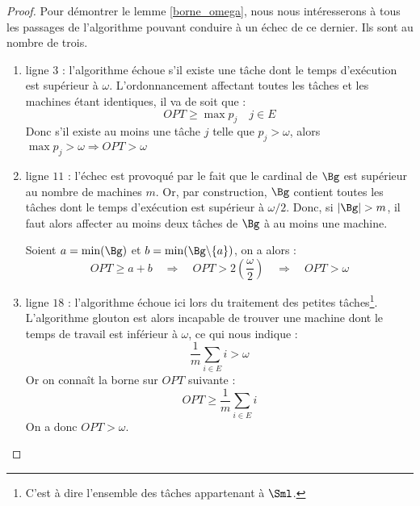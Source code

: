 \documentclass[a4paper,12pt]{thesis}
\begin{document}
\begin{proof}
    Pour démontrer le lemme \ref{borne_omega}, nous nous intéresserons à tous les passages de
    l'algorithme pouvant conduire à un échec de ce dernier. Ils sont au nombre de trois.
    \begin{enumerate}
        \item ligne $3$ : l'algorithme échoue s'il existe une tâche dont le temps d'exécution est
            supérieur à $\omega$. L'ordonnancement affectant toutes les tâches et les machines étant
            identiques, il va de soit que : \begin{displaymath}
                OPT \geq \max p_j \quad j \in E
            \end{displaymath}
            Donc s'il existe au moins une tâche $j$ telle que $p_j > \omega$, alors $\max p_j >
            \omega \Rightarrow OPT > \omega$
        \item ligne $11$ : l'échec est provoqué par le fait que le cardinal de $\Bg$ est supérieur
            au nombre de machines $m$. Or, par construction, $\Bg$ contient toutes les tâches dont
            le temps d'exécution est supérieur à $\omega / 2$. Donc, si $|\Bg| > m$, il faut alors
            affecter au moins deux tâches de $\Bg$ à au moins une machine. 

            Soient $a = \min(\Bg)$ et $b = \min(\Bg \backslash \{a\})$, on a alors :
            \begin{displaymath}
                OPT \geq a + b \quad \Rightarrow \quad OPT > 2 \left ( \frac{\omega}{2} \right )
                \quad \Rightarrow \quad OPT > \omega
            \end{displaymath}
        \item ligne $18$ : l'algorithme échoue ici lors du traitement des petites tâches\footnote{C'est
            à dire l'ensemble des tâches appartenant à $\Sml$.}. L'algorithme glouton est alors
            incapable de trouver une machine dont le temps de travail est inférieur à $\omega$, ce
            qui nous indique : \begin{displaymath}
                \frac{1}{m} \sum_{i \in E} i > \omega
            \end{displaymath}
            Or on connaît la borne sur $OPT$ suivante :
            \begin{displaymath}
                OPT \geq \frac{1}{m} \sum_{i \in E} i
            \end{displaymath}
            On a donc $OPT > \omega$.
    \end{enumerate}
\end{proof}
\end{document}
